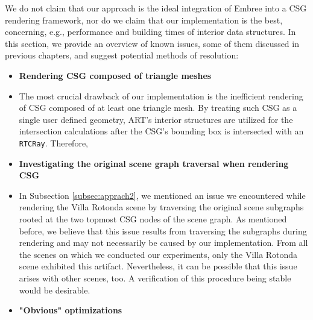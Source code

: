 We do not claim that our approach is the ideal integration of Embree into a CSG rendering framework, nor do we claim that our implementation is the best, concerning, e.g., performance and building times of interior data structures.
In this section, we provide an overview of known issues, some of them discussed in previous chapters, and suggest potential methods of resolution:
\\

\begin{itemize}
	\setlength\itemsep{0.05em}
	
	\item \textbf{Rendering CSG composed of triangle meshes}
	
	\item[] The most crucial drawback of our implementation is the inefficient rendering of CSG composed of at least one triangle mesh. By treating such CSG as a single user defined geometry, ART's interior structures are utilized for the intersection calculations after the CSG's bounding box is intersected with an \texttt{RTCRay}. Therefore,  
	\\
	
	\item \textbf{Investigating the original scene graph traversal when rendering CSG}
	
	\item[] In Subsection \ref{subsec:apprach2}, we mentioned an issue we encountered while rendering the Villa Rotonda scene by traversing the original scene subgraphs rooted at the two topmost CSG nodes of the scene graph. As mentioned before, we believe that this issue results from traversing the subgraphs during rendering and may not necessarily be caused by our implementation. From all the scenes on which we conducted our experiments, only the Villa Rotonda scene exhibited this artifact. Nevertheless, it can be possible that this issue arises with other scenes, too. A verification of this procedure being stable would be desirable.
	\\
	
	\item \textbf{"Obvious" optimizations}
	

\end{itemize}
